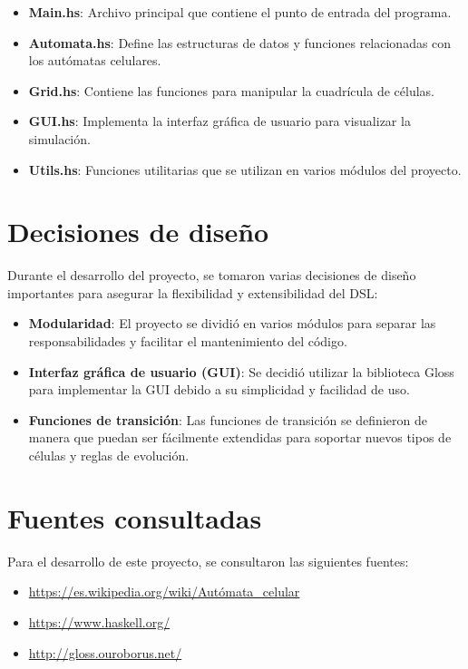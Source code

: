 \documentclass[a4paper,11pt]{article}
\theoremstyle{mytheor}
\begin{document}
\begin{itemize}
    \item \textbf{Main.hs}: Archivo principal que contiene el punto de entrada del programa.
    \item \textbf{Automata.hs}: Define las estructuras de datos y funciones relacionadas con los autómatas celulares.
    \item \textbf{Grid.hs}: Contiene las funciones para manipular la cuadrícula de células.
    \item \textbf{GUI.hs}: Implementa la interfaz gráfica de usuario para visualizar la simulación.
    \item \textbf{Utils.hs}: Funciones utilitarias que se utilizan en varios módulos del proyecto.
\end{itemize}

\section{Decisiones de diseño}
Durante el desarrollo del proyecto, se tomaron varias decisiones de diseño importantes para asegurar la flexibilidad y extensibilidad del DSL:

\begin{itemize}
    \item \textbf{Modularidad}: El proyecto se dividió en varios módulos para separar las responsabilidades y facilitar el mantenimiento del código.
    \item \textbf{Interfaz gráfica de usuario (GUI)}: Se decidió utilizar la biblioteca Gloss para implementar la GUI debido a su simplicidad y facilidad de uso.
    \item \textbf{Funciones de transición}: Las funciones de transición se definieron de manera que puedan ser fácilmente extendidas para soportar nuevos tipos de células y reglas de evolución.
\end{itemize}

\section{Fuentes consultadas}
Para el desarrollo de este proyecto, se consultaron las siguientes fuentes:

\begin{itemize}
    \item \url{https://es.wikipedia.org/wiki/Autómata_celular}
    \item \url{https://www.haskell.org/}
    \item \url{http://gloss.ouroborus.net/}
\end{itemize}
\end{document}
